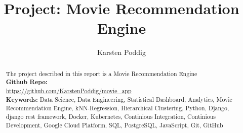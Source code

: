 \documentclass{article}
\title{Project: Movie Recommendation Engine}
\author{Karsten Poddig}
\begin{document}
\maketitle

\begin{abstract}
The project described in this report is a Movie Recommendation Engine\\[2ex]
\textbf{Github Repo:}\\
\url{https://github.com/KarstenPoddig/movie_app}\\[2ex]
\textbf{Keywords:} Data Science, Data Engineering, Statistical Dashboard, Analytics, Movie Recommendation Engine, kNN-Regression, Hierarchical Clustering,  Python, Django, django rest framework, Docker, Kubernetes, Continious Integration, Continious Development, Google Cloud Platform, SQL, PostgreSQL, JavaScript, Git, GitHub


\end{abstract}
\end{document}
